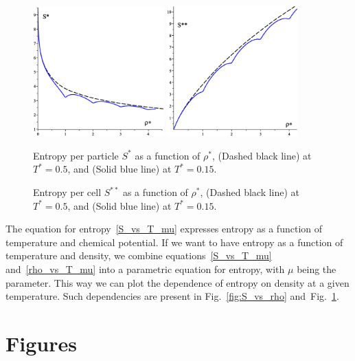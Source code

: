 \documentclass[12pt]{article}
\numberwithin{equation}{section}
\begin{document}
	\begin{figure}[htbp]
		\includegraphics[width=0.45\textwidth,angle=0]{S_vs_rho}
		\hfill
		\includegraphics[width=0.45\textwidth,angle=0]{SS_vs_rho}
		\\
		\parbox{0.45\textwidth}{\caption{\label{fig:S_vs_rho} Entropy per particle $S^{*}$ as a function of $\rho^*$, (Dashed black line) at $T^*=0.5$, and (Solid blue line) at $T^*=0.15$.}}
		\hfill
		\parbox{0.45\textwidth}{\caption{\label{fig:SS_vs_rho} Entropy per cell $S^{**}$ as a function of $\rho^*$, (Dashed black line) at $T^*=0.5$, and (Solid blue line) at $T^*=0.15$.}}
	\end{figure}
	
	The equation for entropy~\eqref{S_vs_T_mu} expresses entropy as a function of temperature and chemical potential. If we want to have entropy as a function of temperature and density, we combine equations~\eqref{S_vs_T_mu} and~\eqref{rho_vs_T_mu} into a parametric equation for entropy, with $\mu$ being the parameter. This way we can plot the dependence of entropy on density at a given temperature. Such dependencies are present in Fig.~\ref{fig:S_vs_rho} and~Fig.~\ref{fig:SS_vs_rho}.
	
	
	\pagebreak
	
	\section{Figures}
\end{document}
